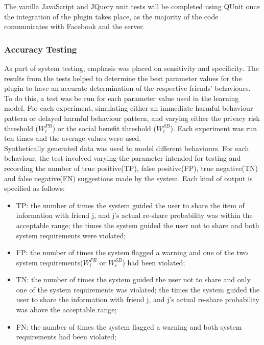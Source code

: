 \documentclass[a4paper,11pt]{article}
\begin{document}
The vanilla JavaScript and JQuery unit tests will be completed using QUnit\cite{QUnit} once the integration of the plugin takes place, as the majority of the code communicates with Facebook and the server.

\subsubsection {Accuracy Testing}
As part of system testing, emphasis was placed on sensitivity and specificity\cite{SnS}. The results from the tests helped to determine the best parameter values for the plugin to have an accurate determination of the respective friends' behaviours.
\\
\indent To do this, a test was be run for each parameter value used in the learning model. For each experiment, simulating either an immediate harmful behaviour pattern or delayed harmful behaviour pattern, and varying either the privacy risk threshold ($W_i^{PR}$) or the social benefit threshold ($W_i^{SB}$). Each experiment was run ten times and the average values were used.
\\
\indent Synthetically generated data was used to model different behaviours. For each behaviour, the test involved varying the parameter intended for testing and recording the number of true positive(TP), false positive(FP), true negative(TN) and false negative(FN) suggestions made by the system.  Each kind of output is specified as follows:
\begin{itemize}
\item TP: the number of times the system guided the user to share the item of information with friend j, and j's actual re-share probability was within the acceptable range; the times the system guided the user not to share and both system requirements were violated;

\item FP: the number of times the system flagged a warning and one of the two system requirements($W_i^{PR}$ or $W_i^{SB}$) had been violated;

\item TN: the number of times the system guided the user not to share and only one of the system requirements was violated; the times the system guided the user to share the information with friend j, and j's actual re-share probability was above the acceptable range;

\item FN: the number of times the system flagged a warning and both system requirements had been violated;
\end{itemize}
\end{document}
